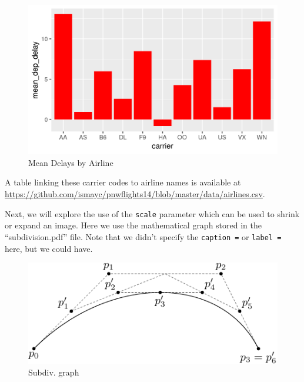 \documentclass[12pt,twoside]{amherstthesis}
\begin{document}
  \begin{figure}[htbp]
  \centering
  \includegraphics[scale = 0.3,angle = 0]{figure/delays.png}
  \caption[Mean Delays by Airline]{\normalsize{Mean Delays by Airline}}
  \label{fig:delays}
  \end{figure}
  
  A table linking these carrier codes to airline names is available at
  \url{https://github.com/ismayc/pnwflights14/blob/master/data/airlines.csv}.
  
  \clearpage
  
  Next, we will explore the use of the \texttt{scale} parameter which can
  be used to shrink or expand an image. Here we use the mathematical graph
  stored in the ``subdivision.pdf'' file. Note that we didn't specify the
  \texttt{caption\ =} or \texttt{label\ =} here, but we could have.
  
  \begin{Shaded}
  \begin{Highlighting}[]
  \NormalTok{(}\NormalTok{, }\NormalTok{, }\NormalTok{, }
         \NormalTok{)}
  \end{Highlighting}
  \end{Shaded}
  
  \begin{figure}[htbp]
  \centering
  \includegraphics[scale = 0.75,angle = 0]{figure/subdivision.pdf}
  \caption[Subdiv. graph]{\normalsize{Subdiv. graph}}
  \label{fig:subd}
  \end{figure}
  
\end{document}
